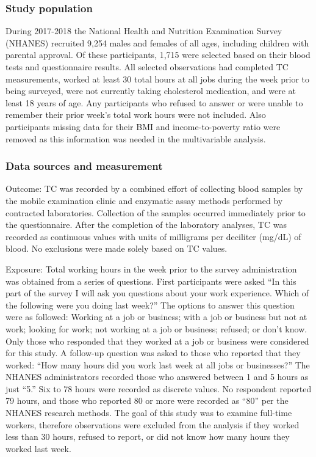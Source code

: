 \documentclass[]{elsarticle} %
\begin{document}
\hypertarget{study-population}{%
\subsubsection{Study population}\label{study-population}}

During 2017-2018 the National Health and Nutrition Examination Survey
(NHANES) recruited 9,254 males and females of all ages, including
children with parental approval. Of these participants, 1,715 were
selected based on their blood tests and questionnaire results. All
selected observations had completed TC measurements, worked at least 30
total hours at all jobs during the week prior to being surveyed, were
not currently taking cholesterol medication, and were at least 18 years
of age. Any participants who refused to answer or were unable to
remember their prior week's total work hours were not included. Also
participants missing data for their BMI and income-to-poverty ratio were
removed as this information was needed in the multivariable analysis.

\hypertarget{data-sources-and-measurement}{%
\subsubsection{Data sources and
measurement}\label{data-sources-and-measurement}}

Outcome: TC was recorded by a combined effort of collecting blood
samples by the mobile examination clinic and enzymatic assay methods
performed by contracted laboratories. Collection of the samples occurred
immediately prior to the questionnaire. After the completion of the
laboratory analyses, TC was recorded as continuous values with units of
milligrams per deciliter (mg/dL) of blood. No exclusions were made
solely based on TC values.

Exposure: Total working hours in the week prior to the survey
administration was obtained from a series of questions. First
participants were asked ``In this part of the survey I will ask you
questions about your work experience. Which of the following were you
doing last week?'' The options to answer this question were as followed:
Working at a job or business; with a job or business but not at work;
looking for work; not working at a job or business; refused; or don't
know. Only those who responded that they worked at a job or business
were considered for this study. A follow-up question was asked to those
who reported that they worked: ``How many hours did you work last week
at all jobs or businesses?'' The NHANES administrators recorded those
who answered between 1 and 5 hours as just ``5.'' Six to 78 hours were
recorded as discrete values. No respondent reported 79 hours, and those
who reported 80 or more were recorded as ``80'' per the NHANES research
methods. The goal of this study was to examine full-time workers,
therefore observations were excluded from the analysis if they worked
less than 30 hours, refused to report, or did not know how many hours
they worked last week.
\end{document}
